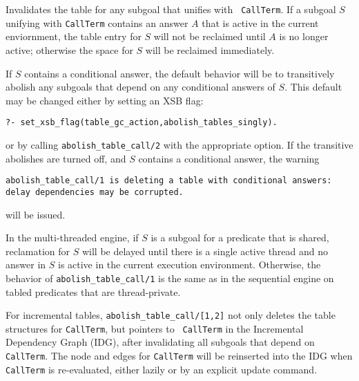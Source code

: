 \begin{description}
\begin{description}
%
Invalidates the table for any subgoal that unifies with {\tt
  CallTerm}.  If a subgoal $S$ unifying with {\tt CallTerm} contains
an answer $A$ that is active in the current enviornment, the table
entry for $S$ will not be reclaimed until $A$ is no longer active;
otherwise the space for $S$ will be reclaimed immediately.

If $S$ contains a conditional answer, the default behavior will be to
transitively abolish any subgoals that depend on any conditional
answers of $S$.  This default may be changed either by setting an XSB
flag:
%
\begin{verbatim}
?- set_xsb_flag(table_gc_action,abolish_tables_singly).
\end{verbatim}
% 
or by calling {\tt abolish\_table\_call/2} with the appropriate
option.  If the transitive abolishes are turned off, and $S$ contains
a conditional answer, the warning

{\tt abolish\_table\_call/1 is deleting a table with
  conditional\ answers: \\ delay dependencies may be corrupted.}

will be issued.  

In the multi-threaded engine, if $S$ is a subgoal for a predicate that
is shared, reclamation for $S$ will be delayed until there is a single
active thread and no answer in $S$ is active in the current execution
environment.  Otherwise, the behavior of {\tt abolish\_table\_call/1}
is the same as in the sequential engine on tabled predicates that are
thread-private.

%
For incremental tables, {\tt abolish\_table\_call/[1,2]} not only
deletes the table structures for {\tt CallTerm}, but pointers to {\tt
  CallTerm} in the Incremental Dependency Graph (IDG), after
invalidating all subgoals that depend on {\tt CallTerm}. The node and
edges for {\tt CallTerm} will be reinserted into the IDG when {\tt
  CallTerm} is re-evaluated, either lazily or by an explicit update
command.



\end{description}
\end{description}
